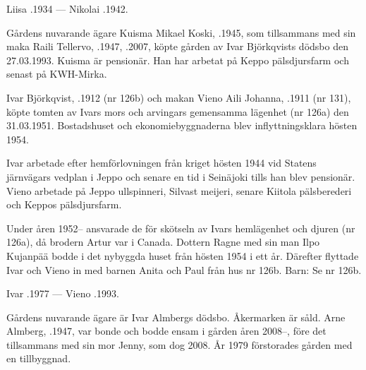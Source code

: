 Liisa .1934  ---  Nikolai .1942.



%



%
Gårdens nuvarande ägare Kuisma Mikael Koski, .1945, som tillsammans med sin maka Raili Tellervo, .1947, .2007, köpte gården av Ivar Björkqvists dödsbo den 27.03.1993. Kuisma är pensionär. Han har arbetat på Keppo pälsdjursfarm och senast på KWH-Mirka.


%
Ivar Björkqvist, .1912 (nr 126b) och makan Vieno Aili Johanna, .1911 (nr 131), köpte tomten av Ivars mors och arvingars gemensamma lägenhet (nr 126a) den 31.03.1951. Bostadshuset och ekonomiebyggnaderna blev inflyttningsklara hösten 1954.

Ivar arbetade efter hemförlovningen från kriget hösten  1944 vid Statens järnvägars vedplan i Jeppo och senare en tid i Seinäjoki tills han blev pensionär. Vieno arbetade på Jeppo ullspinneri, Silvast meijeri, senare Kiitola pälsberederi och Keppos pälsdjursfarm.

Under åren 1952-- ansvarade de för skötseln av Ivars hemlägenhet och djuren (nr 126a), då brodern Artur var i Canada. Dottern Ragne med sin man Ilpo Kujanpää bodde i det nybyggda huset från hösten 1954 i ett år. Därefter flyttade Ivar och Vieno in med barnen Anita och Paul från hus nr 126b. Barn: Se nr 126b.

Ivar .1977  ---  Vieno .1993.



%



%
Gårdens nuvarande ägare är Ivar Almbergs dödsbo. Åkermarken är såld. Arne Almberg, .1947, var bonde och bodde ensam i gården åren 2008--, före det tillsammans med sin mor Jenny, som dog 2008. År 1979 förstorades gården med en tillbyggnad.

